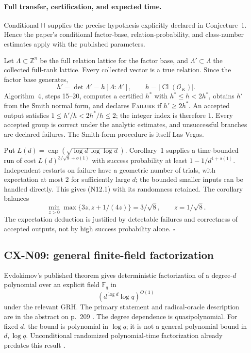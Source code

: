 \paragraph{Full transfer, certification, and expected time.}
Conditional \(\mathsf H\) supplies the precise hypothesis explicitly
declared in Conjecture~1. Hence the paper's conditional factor-base,
relation-probability, and class-number estimates apply with the
published parameters.

Let \(\Lambda\subset\mathbb Z^n\) be the full relation lattice for the
factor base, and \(\Lambda'\subset\Lambda\) the collected full-rank
lattice. Every collected vector is a true relation. Since the factor
base generates,
\[
       h'=\det\Lambda'=h[\Lambda:\Lambda'],\qquad
       h=|\operatorname{Cl}(\mathcal O_K)|.
\]
Algorithm~4, steps 15--20, computes a certified \(h^*\) with
\(h^*\leq h<2h^*\), obtains \(h'\) from the Smith normal form, and
declares \textsc{Failure} if \(h'\geq2h^*\).
An accepted output satisfies \(1\leq h'/h<2h^*/h\leq2\);
the integer index is therefore \(1\). Every accepted group is correct
under the analytic estimates, and unsuccessful branches are declared
failures. The Smith-form procedure is itself Las Vegas.

Put \(L(d)=\exp(\sqrt{\log d\,\log\log d})\).
Corollary~1 supplies a time-bounded run of cost
\(L(d)^{3/\sqrt8+o(1)}\) with success probability at least
\(1-1/d^{1+o(1)}\). Independent restarts on failure have a geometric
number of trials, with expectation at most \(2\) for sufficiently
large \(d\); the bounded smaller inputs can be handled directly.
This gives (N12.1) with its randomness retained. The corollary balances
\[
             \min_{z>0}\max\{3z,z+1/(4z)\}=3/\sqrt8,
             \qquad z=1/\sqrt8.
\]
The expectation deduction is justified by detectable failures and
correctness of accepted outputs, not by high success probability alone.
\(\square\)

\subsection{CX-N09: general finite-field factorization}
\label{cx-n09}

Evdokimov's published theorem gives deterministic factorization of a
degree-\(d\) polynomial over an explicit field \(\mathbb F_q\) in
\[
                            (d^{\log d}\log q)^{O(1)}            \tag{N09.1}
\]
under the relevant GRH. The primary statement and radical-oracle
description are in the abstract on p.~209 \cite{CXNEvdokimov94}.
The degree dependence is quasipolynomial. For fixed \(d\), the bound
is polynomial in \(\log q\); it is not a general polynomial bound
in \(d,\log q\). Unconditional randomized polynomial-time factorization
already predates this result \cite[introduction, author pp.~1--2]{CXNGao01}.

